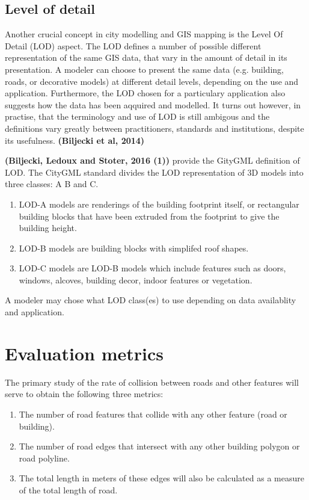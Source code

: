 \documentclass{kththesis}
\begin{document}
\subsection{Level of detail}

Another crucial concept in city modelling and GIS mapping is the Level Of Detail (LOD) aspect.
The LOD defines a number of possible different representation of the same GIS data, that vary in the amount of detail in its presentation.
A modeler can choose to present the same data (e.g. building, roads, or decorative models) at different detail levels, depending on the use and application.
Furthermore, the LOD chosen for a particulary application also suggests how the data has been aqquired and modelled.
It turns out however, in practise, that the terminology and use of LOD is still ambigous and the definitions vary greatly between practitioners, standards and institutions, despite its usefulness.
\textbf{(Biljecki et al, 2014)}

\textbf{(Biljecki, Ledoux and Stoter, 2016 (1))} provide the GityGML definition of LOD.
The CityGML standard divides the LOD representation of 3D models into three classes: A B and C.
\begin{enumerate}
    \item LOD-A models are renderings of the building footprint itself, or rectangular building blocks that have been extruded from the footprint to give the building height.
    \item LOD-B models are building blocks with simplifed roof shapes.
    \item LOD-C models are LOD-B models which include features such as doors, windows, alcoves, building decor, indoor features or vegetation.
\end{enumerate}
A modeler may chose what LOD class(es) to use depending on data availablity and application.

\section{Evaluation metrics}

The primary study of the rate of collision between roads and other features will serve to obtain the following three metrics:

\begin{enumerate}
    \item The number of road features that collide with any other feature (road or building).
    \item The number of road edges that intersect with any other building polygon or road polyline.
    \item The total length in meters of these edges will also be calculated as a measure of the total length of road.
\end{enumerate}
\end{document}
